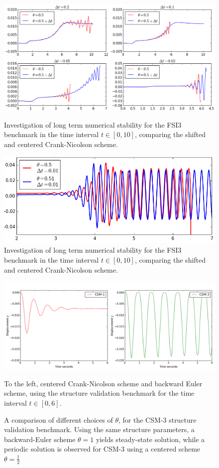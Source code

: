 \begin{figure}[h!]
        \centering
    \includegraphics[scale=0.6]{./Fig/thetacheck.png} \\
      \caption{Investigation of long term numerical stability for the FSI3 benchmark in the time interval $t \in [0, 10]$, comparing the shifted and centered Crank-Nicolson scheme. }
\label{fig:cncomp1}
\end{figure}
\begin{figure}[h!]
        \centering
    \includegraphics[scale=0.6]{./Fig/besttheta.png}
      \caption{Investigation of long term numerical stability for the FSI3 benchmark in the time interval $t \in [0, 10]$, comparing the shifted and centered Crank-Nicolson scheme. }
\label{fig:cncomp2}
\end{figure}
\newpage
\begin{figure}[h!]
        \centering
    \includegraphics[scale=0.4]{./Fig/thetacompare.png}
      \caption{A comparison of different choices of $\theta$, for the CSM-3 structure validation benchmark. Using the same structure parameters, a backward-Euler scheme $\theta = 1$ yields steady-state solution, while a periodic solution is observed for CSM-3 using a centered scheme $\theta = \frac{1}{2}$ }
      
      To the left,  centered Crank-Nicolson scheme and backward Euler scheme, using the structure validation benchmark for the time interval  $t \in [0, 6]$. 
\label{fig:csm1scm3}
\end{figure}
\newpage
